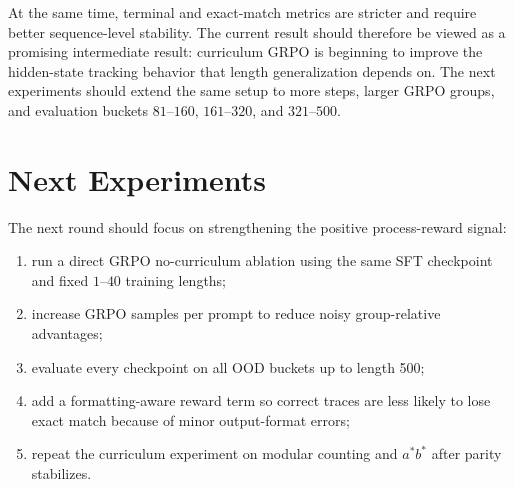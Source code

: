 \documentclass[11pt]{article}
\begin{document}
At the same time, terminal and exact-match metrics are stricter and require better sequence-level stability. The current result should therefore be viewed as a promising intermediate result: curriculum GRPO is beginning to improve the hidden-state tracking behavior that length generalization depends on. The next experiments should extend the same setup to more steps, larger GRPO groups, and evaluation buckets $81$--$160$, $161$--$320$, and $321$--$500$.

\section{Next Experiments}
The next round should focus on strengthening the positive process-reward signal:
\begin{enumerate}[leftmargin=*]
  \item run a direct GRPO no-curriculum ablation using the same SFT checkpoint and fixed $1$--$40$ training lengths;
  \item increase GRPO samples per prompt to reduce noisy group-relative advantages;
  \item evaluate every checkpoint on all OOD buckets up to length 500;
  \item add a formatting-aware reward term so correct traces are less likely to lose exact match because of minor output-format errors;
  \item repeat the curriculum experiment on modular counting and $a^*b^*$ after parity stabilizes.
\end{enumerate}
\end{document}
